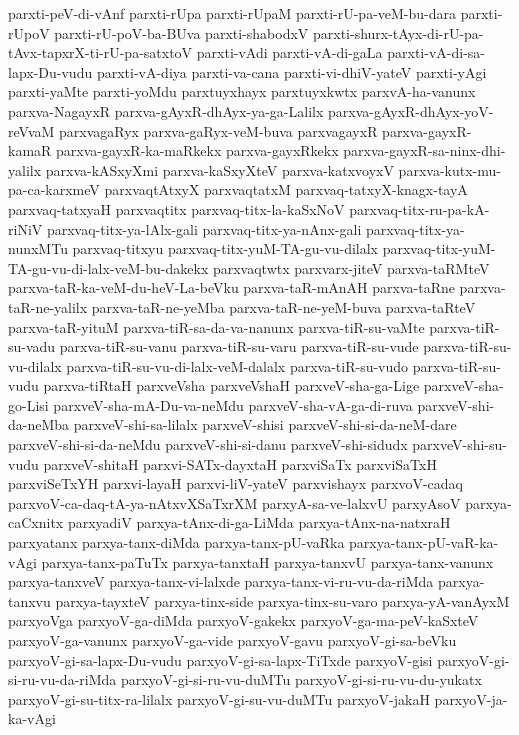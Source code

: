 {parxti-peV-di-vAnf
parxti-rUpa
parxti-rUpaM
parxti-rU-pa-veM-bu-dara
parxti-rUpoV
parxti-rU-poV-ba-BUva
parxti-shabodxV
parxti-shurx-tAyx-di-rU-pa-tAvx-tapxrX-ti-rU-pa-satxtoV
parxti-vAdi
parxti-vA-di-gaLa
parxti-vA-di-sa-lapx-Du-vudu
parxti-vA-diya
parxti-va-cana
parxti-vi-dhiV-yateV
parxti-yAgi
parxti-yaMte
parxti-yoMdu
parxtuyxhayx
parxtuyxkwtx
parxvA-ha-vanunx
parxva-NagayxR
parxva-gAyxR-dhAyx-ya-ga-Lalilx
parxva-gAyxR-dhAyx-yoV-reVvaM
parxvagaRyx
parxva-gaRyx-veM-buva
parxvagayxR
parxva-gayxR-kamaR
parxva-gayxR-ka-maRkekx
parxva-gayxRkekx
parxva-gayxR-sa-ninx-dhi-yalilx
parxva-kASxyXmi
parxva-kaSxyXteV
parxva-katxvoyxV
parxva-kutx-mu-pa-ca-karxmeV
parxvaqtAtxyX
parxvaqtatxM
parxvaq-tatxyX-knagx-tayA
parxvaq-tatxyaH
parxvaqtitx
parxvaq-titx-la-kaSxNoV
parxvaq-titx-ru-pa-kA-riNiV
parxvaq-titx-ya-lAlx-gali
parxvaq-titx-ya-nAnx-gali
parxvaq-titx-ya-nunxMTu
parxvaq-titxyu
parxvaq-titx-yuM-TA-gu-vu-dilalx
parxvaq-titx-yuM-TA-gu-vu-di-lalx-veM-bu-dakekx
parxvaqtwtx
parxvarx-jiteV
parxva-taRMteV
parxva-taR-ka-veM-du-heV-La-beVku
parxva-taR-mAnAH
parxva-taRne
parxva-taR-ne-yalilx
parxva-taR-ne-yeMba
parxva-taR-ne-yeM-buva
parxva-taRteV
parxva-taR-yituM
parxva-tiR-sa-da-va-nanunx
parxva-tiR-su-vaMte
parxva-tiR-su-vadu
parxva-tiR-su-vanu
parxva-tiR-su-varu
parxva-tiR-su-vude
parxva-tiR-su-vu-dilalx
parxva-tiR-su-vu-di-lalx-veM-dalalx
parxva-tiR-su-vudo
parxva-tiR-su-vudu
parxva-tiRtaH
parxveVsha
parxveVshaH
parxveV-sha-ga-Lige
parxveV-sha-go-Lisi
parxveV-sha-mA-Du-va-neMdu
parxveV-sha-vA-ga-di-ruva
parxveV-shi-da-neMba
parxveV-shi-sa-lilalx
parxveV-shisi
parxveV-shi-si-da-neM-dare
parxveV-shi-si-da-neMdu
parxveV-shi-si-danu
parxveV-shi-sidudx
parxveV-shi-su-vudu
parxveV-shitaH
parxvi-SATx-dayxtaH
parxviSaTx
parxviSaTxH
parxviSeTxYH
parxvi-layaH
parxvi-liV-yateV
parxvishayx
parxvoV-cadaq
parxvoV-ca-daq-tA-ya-nAtxvXSaTxrXM
parxyA-sa-ve-lalxvU
parxyAsoV
parxya-caCxnitx
parxyadiV
parxya-tAnx-di-ga-LiMda
parxya-tAnx-na-natxraH
parxyatanx
parxya-tanx-diMda
parxya-tanx-pU-vaRka
parxya-tanx-pU-vaR-ka-vAgi
parxya-tanx-paTuTx
parxya-tanxtaH
parxya-tanxvU
parxya-tanx-vanunx
parxya-tanxveV
parxya-tanx-vi-lalxde
parxya-tanx-vi-ru-vu-da-riMda
parxya-tanxvu
parxya-tayxteV
parxya-tinx-side
parxya-tinx-su-varo
parxya-yA-vanAyxM
parxyoVga
parxyoV-ga-diMda
parxyoV-gakekx
parxyoV-ga-ma-peV-kaSxteV
parxyoV-ga-vanunx
parxyoV-ga-vide
parxyoV-gavu
parxyoV-gi-sa-beVku
parxyoV-gi-sa-lapx-Du-vudu
parxyoV-gi-sa-lapx-TiTxde
parxyoV-gisi
parxyoV-gi-si-ru-vu-da-riMda
parxyoV-gi-si-ru-vu-duMTu
parxyoV-gi-si-ru-vu-du-yukatx
parxyoV-gi-su-titx-ra-lilalx
parxyoV-gi-su-vu-duMTu
parxyoV-jakaH
parxyoV-ja-ka-vAgi
}
